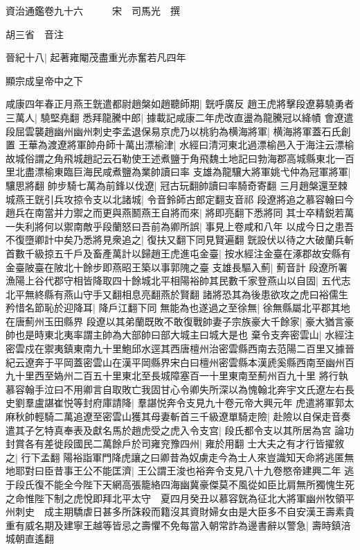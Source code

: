 資治通鑑卷九十六　　　宋　司馬光　撰

胡三省　音注

晉紀十八|{
	起著雍閹茂盡重光赤奮若凡四年}


顯宗成皇帝中之下

咸康四年春正月燕王皝遣都尉趙槃如趙聽師期|{
	皝呼廣反}
趙王虎將擊段遼募驍勇者三萬人|{
	驍堅堯翻}
悉拜龍騰中郎|{
	據載記咸康二年虎改直盪為龍騰冠以絳幘}
會遼遣段屈雲襲趙幽州幽州刺史李孟退保易京虎乃以桃豹為横海將軍|{
	横海將軍蓋石氏創置}
王華為渡遼將軍帥舟師十萬出漂榆津|{
	水經曰清河東北過漂榆邑入于海注云漂榆故城俗謂之角飛城趙記云石勒使王述煮鹽于角飛魏土地記曰勃海郡高城縣東北一百里北盡漂榆東臨巨海民咸煮鹽為業帥讀曰率}
支雄為龍驤大將軍姚弋仲為冠軍將軍|{
	驤思將翻}
帥步騎七萬為前鋒以伐遼|{
	冠古玩翻帥讀曰率騎奇寄翻}
三月趙槃還至棘城燕王皝引兵攻掠令支以北諸城|{
	令音鈴師古郎定翻支音祁}
段遼將追之慕容翰曰今趙兵在南當并力禦之而更與燕鬭燕王自將而來|{
	將即亮翻下悉將同}
其士卒精鋭若萬一失利將何以禦南敵乎段蘭怒曰吾前為卿所誤|{
	事見上卷咸和八年}
以成今日之患吾不復墮卿計中矣乃悉將見衆追之|{
	復扶又翻下同見賢遍翻}
皝設伏以待之大破蘭兵斬首數千級掠五千戶及畜產萬計以歸趙王虎進屯金臺|{
	按水經注金臺在涿郡故安縣有金臺陂臺在陂北十餘步即燕昭王築以事郭隗之臺}
支雄長驅入薊|{
	薊音計}
段遼所署漁陽上谷代郡守相皆降取四十餘城北平相陽裕帥其民數千家登燕山以自固|{
	五代志北平無終縣有燕山守手又翻相息亮翻燕於賢翻}
諸將恐其為後患欲攻之虎曰裕儒生矜惜名節恥於迎降耳|{
	降戶江翻下同}
無能為也遂過之至徐無|{
	徐無縣屬北平郡其地在唐薊州玉田縣界}
段遼以其弟蘭既敗不敢復戰帥妻子宗族豪大千餘家|{
	豪大猶言豪帥也是時東北夷率謂主帥為大部帥曰部大城主曰城大是也}
棄令支奔密雲山|{
	水經注密雲戍在禦夷鎮東南九十里鮑邱水逕其西唐檀州治密雲縣西南去范陽二百里又據晉紀云遼奔于平岡蓋密雲山在漢平岡縣界宋白曰檀州密雲縣本漢虒奚縣西南至幽州百九十里西至媯州二百五十里東北至長城障塞百一十里東南至薊州百九十里}
將行執慕容翰手泣曰不用卿言自取敗亡我固甘心令卿失所深以為愧翰北奔宇文氏遼左右長史劉羣盧諶崔悦等封府庫請降|{
	羣諶悦奔令支見九十卷元帝大興元年}
虎遣將軍郭太麻秋帥輕騎二萬追遼至密雲山獲其母妻斬首三千級遼單騎走險|{
	赴險以自保走音奏}
遣其子乞特真奉表及獻名馬於趙虎受之虎入令支宫|{
	段氏都令支以其所居為宫}
論功封賞各有差徙段國民二萬餘戶於司雍兖豫四州|{
	雍於用翻}
士大夫之有才行皆擢敘之|{
	行下孟翻}
陽裕詣軍門降虎讓之曰卿昔為奴虜走今為士人來豈識知天命將逃匿無地耶對曰臣昔事王公不能匡濟|{
	王公謂王浚也裕奔令支見八十九卷愍帝建興二年}
逃于段氏復不能全今陛下天網高張籠絡四海幽冀豪傑莫不風從如臣比肩無所獨愧生死之命惟陛下制之虎悅即拜北平太守　夏四月癸丑以慕容皝為征北大將軍幽州牧領平州刺史　成主期驕虐日甚多所誅殺而籍沒其資財婦女由是大臣多不自安漢王壽素貴重有威名期及建寧王越等皆忌之壽懼不免每當入朝常詐為邊書辭以警急|{
	壽時鎮涪城朝直遙翻}
